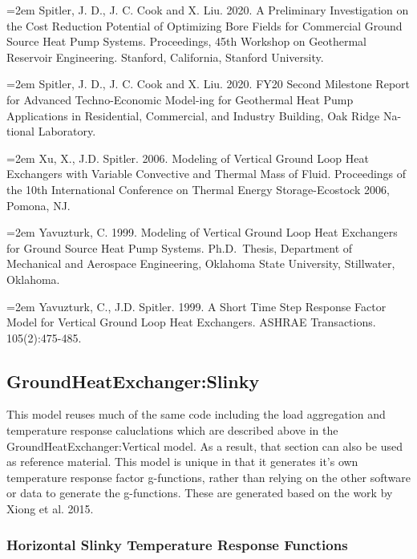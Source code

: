 \hangindent=2em
\noindent Spitler, J. D., J. C. Cook and X. Liu. 2020. A Preliminary Investigation on the Cost Reduction Potential of Optimizing Bore Fields for Commercial Ground Source Heat Pump Systems. Proceedings, 45th Workshop on Geothermal Reservoir Engineering. Stanford, California, Stanford University. 

\hangindent=2em
\noindent Spitler, J. D., J. C. Cook and X. Liu. 2020. FY20 Second Milestone Report for Advanced Techno-Economic Model-ing for Geothermal Heat Pump Applications in Residential, Commercial, and Industry Building, Oak Ridge Na-tional Laboratory.

\hangindent=2em
\noindent Xu, X., J.D. Spitler. 2006. Modeling of Vertical Ground Loop Heat Exchangers with Variable Convective and Thermal Mass of Fluid. Proceedings of the 10th International Conference on Thermal Energy Storage-Ecostock 2006, Pomona, NJ.

\hangindent=2em
\noindent Yavuzturk, C. 1999. Modeling of Vertical Ground Loop Heat Exchangers for Ground Source Heat Pump Systems. Ph.D.~Thesis, Department of Mechanical and Aerospace Engineering, Oklahoma State University, Stillwater, Oklahoma.

\hangindent=2em
\noindent Yavuzturk, C., J.D. Spitler. 1999. A Short Time Step Response Factor Model for Vertical Ground Loop Heat Exchangers. ASHRAE Transactions. 105(2):475-485.

\subsection{GroundHeatExchanger:Slinky}\label{groundheatexchangerslinky}

This model reuses much of the same code including the load aggregation and temperature response caluclations which are described above in the GroundHeatExchanger:Vertical model. As a result, that section can also be used as reference material. This model is unique in that it generates it's own temperature response factor g-functions, rather than relying on the other software or data to generate the g-functions. These are generated based on the work by Xiong et al. 2015.

\subsubsection{Horizontal Slinky Temperature Response Functions}\label{horizontal-slinky-temperature-response-functions}

